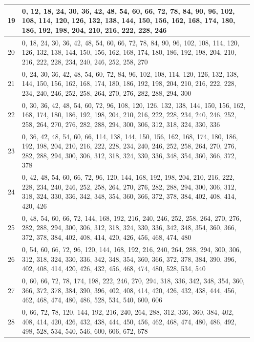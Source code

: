 \documentclass[12pt,a4paper]{article}
\begin{document}
\begin{table}[h]
\begin{center}
{\begin{tabular}{|c|p{15cm}|}
					19 & 0, 12, 18, 24, 30, 36, 42, 48, 54, 60, 66, 72, 78, 84, 90, 96, 102, 108, 114, 120, 126, 132, 138, 144, 150, 156, 162, 168, 174, 180, 186, 192, 198, 204, 210, 216, 222, 228, 246 \\ \hline
					20 & 0, 18, 24, 30, 36, 42, 48, 54, 60, 66, 72, 78, 84, 90, 96, 102, 108, 114, 120, 126, 132, 138, 144, 150, 156, 162, 168, 174, 180, 186, 192, 198, 204, 210, 216, 222, 228, 234, 240, 246, 252, 258, 270 \\ \hline
					21 & 0, 24, 30, 36, 42, 48, 54, 60, 72, 84, 96, 102, 108, 114, 120, 126, 132, 138, 144, 150, 156, 162, 168, 174, 180, 186, 192, 198, 204, 210, 216, 222, 228, 234, 240, 246, 252, 258, 264, 270, 276, 282, 288, 294, 300 \\ \hline
					22 & 0, 30, 36, 42, 48, 54, 60, 72, 96, 108, 120, 126, 132, 138, 144, 150, 156, 162, 168, 174, 180, 186, 192, 198, 204, 210, 216, 222, 228, 234, 240, 246, 252, 258, 264, 270, 276, 282, 288, 294, 300, 306, 312, 318, 324, 330, 336 \\ \hline
					23 & 0, 36, 42, 48, 54, 60, 66, 114, 138, 144, 150, 156, 162, 168, 174, 180, 186, 192, 198, 204, 210, 216, 222, 228, 234, 240, 246, 252, 258, 264, 270, 276, 282, 288, 294, 300, 306, 312, 318, 324, 330, 336, 348, 354, 360, 366, 372, 378 \\ \hline
					24 & 0, 42, 48, 54, 60, 66, 72, 96, 120, 144, 168, 192, 198, 204, 210, 216, 222, 228, 234, 240, 246, 252, 258, 264, 270, 276, 282, 288, 294, 300, 306, 312, 318, 324, 330, 336, 342, 348, 354, 360, 366, 372, 378, 384, 402, 408, 414, 420, 426 \\ \hline
					25 & 0, 48, 54, 60, 66, 72, 144, 168, 192, 216, 240, 246, 252, 258, 264, 270, 276, 282, 288, 294, 300, 306, 312, 318, 324, 330, 336, 342, 348, 354, 360, 366, 372, 378, 384, 402, 408, 414, 420, 426, 456, 468, 474, 480 \\ \hline
					26 & 0, 54, 60, 66, 72, 96, 120, 144, 168, 192, 216, 240, 264, 288, 294, 300, 306, 312, 318, 324, 330, 336, 342, 348, 354, 360, 366, 372, 378, 384, 390, 396, 402, 408, 414, 420, 426, 432, 456, 468, 474, 480, 528, 534, 540 \\ \hline
					27 & 0, 60, 66, 72, 78, 174, 198, 222, 246, 270, 294, 318, 336, 342, 348, 354, 360, 366, 372, 378, 384, 390, 396, 402, 408, 414, 420, 426, 432, 438, 444, 456, 462, 468, 474, 480, 486, 528, 534, 540, 600, 606 \\ \hline
					28 & 0, 66, 72, 78, 120, 144, 192, 216, 240, 264, 288, 312, 336, 360, 384, 402, 408, 414, 420, 426, 432, 438, 444, 450, 456, 462, 468, 474, 480, 486, 492, 498, 528, 534, 540, 546, 600, 606, 672, 678 \\ \hline

\end{tabular}}
\end{center}
\end{table}
\end{document}
